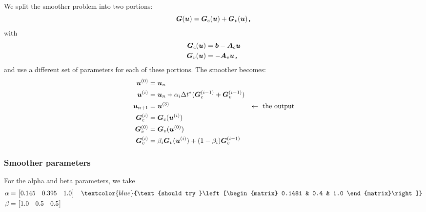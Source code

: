 \documentclass{article}
\newcommand{\todo}[1]{\textcolor{blue}{#1}}
\begin{document}
We split the smoother problem into two portions:
\begin{equation}
    \bm{G}(\bm{u}) = \bm{G}_c(\bm{u}) + \bm{G}_v(\bm{u})
    \texttt{,}
\end{equation}
with
\begin{align}
    \bm{G}_c(\bm{u}) &= \bm{b} - \bm{A}_c\bm{u} \\
    \bm{G}_v(\bm{u}) &= -\bm{A}_v\bm{u}
    \texttt{,}
\end{align}
and use a different set of parameters for each of these portions.
The smoother becomes:
\begin{subequations}
\begin{align}
    \bm{u}^{(0)}        &= \bm{u}_{n} \\
    \bm{u}^{(i)}        &= \bm{u}_{n} + \alpha_i\Delta t^*(\bm{G}_c^{(i-1)} + \bm{G}_v^{(i-1)})  \\
    \bm{u}_{n+1}        &= \bm{u}^{(3)} & \leftarrow \text{ the output}\\
    \bm{G}_c^{(i)} &= \bm{G}_c(\bm{u}^{(i)}) \\
    \bm{G}_v^{(0)} &= \bm{G}_v(\bm{u}^{(0)}) \\
    \bm{G}_v^{(i)} &= \beta_i\bm{G}_v(\bm{u}^{(i)}) + (1 - \beta_i) \bm{G}_v^{(i-1)}
\end{align}
\end{subequations}

\subsubsection{Smoother parameters}

For the alpha and beta parameters, we take
\begin{align}
    \alpha &= \left[\begin{matrix} 0.145 & 0.395 & 1.0 \end{matrix}\right] 
    & \todo{\text{should try }\left[\begin{matrix} 0.1481 & 0.4 & 1.0 \end{matrix}\right]}\\
    \beta  &= \left[\begin{matrix} 1.0 & 0.5 & 0.5 \end{matrix}\right]
\end{align}
\end{document}
